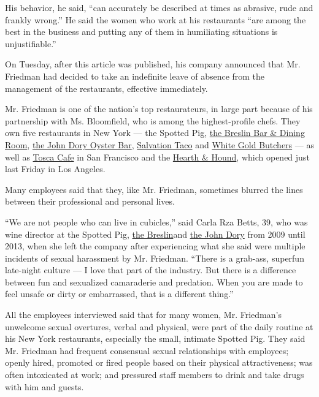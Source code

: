 His behavior, he said, ``can accurately be described at times as
abrasive, rude and frankly wrong.'' He said the women who work at his
restaurants ``are among the best in the business and putting any of them
in humiliating situations is unjustifiable.''

On Tuesday, after this article was published, his company announced that
Mr. Friedman had decided to take an indefinite leave of absence from the
management of the restaurants, effective immediately.

Mr. Friedman is one of the nation's top restaurateurs, in large part
because of his partnership with Ms. Bloomfield, who is among the
highest-profile chefs. They own five restaurants in New York --- the
Spotted Pig, \href{https://www.thebreslin.com/}{the Breslin Bar \&
Dining Room}, \href{https://www.thejohndory.com/}{the John Dory Oyster
Bar}, \href{https://www.salvationtaco.com/}{Salvation Taco} and
\href{https://www.nytimes.com/2017/02/07/dining/white-gold-butchers-review-april-bloomfield-restaurant.html?_r=0}{White
Gold Butchers} --- as well as \href{http://toscacafesf.com/}{Tosca Cafe}
in San Francisco and the
\href{https://www.thehearthandhound.com/}{Hearth \& Hound}, which opened
just last Friday in Los Angeles.

Many employees said that they, like Mr. Friedman, sometimes blurred the
lines between their professional and personal lives.

``We are not people who can live in cubicles,'' said Carla Rza Betts,
39, who was wine director at the Spotted Pig,
\href{https://www.thebreslin.com/}{the Breslin}and
\href{https://www.thejohndory.com/}{the John Dory} from 2009 until 2013,
when she left the company after experiencing what she said were multiple
incidents of sexual harassment by Mr. Friedman. ``There is a grab-ass,
superfun late-night culture --- I love that part of the industry. But
there is a difference between fun and sexualized camaraderie and
predation. When you are made to feel unsafe or dirty or embarrassed,
that is a different thing.''

All the employees interviewed said that for many women, Mr. Friedman's
unwelcome sexual overtures, verbal and physical, were part of the daily
routine at his New York restaurants, especially the small, intimate
Spotted Pig. They said Mr. Friedman had frequent consensual sexual
relationships with employees; openly hired, promoted or fired people
based on their physical attractiveness; was often intoxicated at work;
and pressured staff members to drink and take drugs with him and guests.

